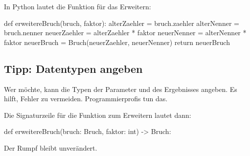 In Python lautet die Funktion für das Erweitern:
\begin{codePython}
def erweitereBruch(bruch, faktor):
	alterZaehler = bruch.zaehler
	alterNenner = bruch.nenner
	neuerZaehler = alterZaehler * faktor
	neuerNenner = alterNenner * faktor
	neuerBruch = Bruch(neuerZaehler, neuerNenner)
	return neuerBruch
\end{codePython}

\subsection{Tipp: Datentypen angeben}

Wer möchte, kann die Typen der Parameter und des Ergebnisses angeben. Es hilft, Fehler zu vermeiden. Programmierprofis tun das.

Die Signaturzeile für die Funktion zum Erweitern lautet dann:
\begin{codePython}
def erweitereBruch(bruch: Bruch, faktor: int) -> Bruch:
\end{codePython}

Der Rumpf bleibt unverändert.


